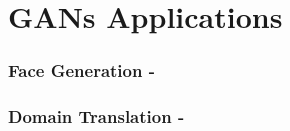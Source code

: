 \documentclass{beamer}
\begin{document}
\section{GANs Applications}



{
	\begin{frame}
		\frametitle{Face Generation - \cite{karrasProgressiveGrowingGANs2017}}
	\end{frame}
}

{
	\begin{frame}
		\frametitle{Domain Translation - \cite{isolaImagetoImageTranslationConditional2016a}}
	\end{frame}
}
\end{document}
